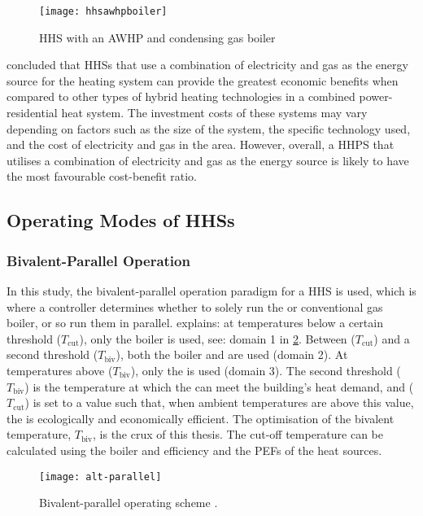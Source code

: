 \begin{figure}[htb]
    \centering
    \texttt{[image: hhsawhpboiler]}
    \caption{\acs{HHS} with an \acs{AWHP} and condensing gas boiler \cite{dongellini_influence_2021}}
    \label{fig:hhsawhpboilerdiagram}
\end{figure}

\citeauthor{heinen_electricity_2016} \cite{heinen_electricity_2016} concluded that \acp{HHS} that use a combination of electricity and gas as the energy source for the heating system can provide the greatest economic benefits when compared to other types of hybrid heating technologies in a combined power-residential heat system. The investment costs of these systems may vary depending on factors such as the size of the system, the specific technology used, and the cost of electricity and gas in the area. However, overall, a \ac{HHPS} that utilises a combination of electricity and gas as the energy source is likely to have the most favourable cost-benefit ratio.


\subsection{Operating Modes of HHSs}

\subsubsection{Bivalent-Parallel Operation}
\label{subsubsec:biv-parallelop}
In this study, the bivalent-parallel operation paradigm for a \ac{HHS} is used, which is where a controller determines whether to solely run the \HP or conventional gas boiler, or so run them in parallel. \citeauthor{buday_2014} \cite{buday_2014} explains: at temperatures below a certain threshold ($T_\text{cut}$), only the boiler is used, see: domain 1 in \cref{fig:alt-parallel}. Between ($T_\text{cut}$) and a second threshold ($T_\text{biv}$), both the boiler and \HP are used (domain 2). At temperatures above ($T_\text{biv}$), only the \HP is used (domain 3). The second threshold ($T_\text{biv}$) is the temperature at which the \HP can meet the building's heat demand, and ($T_\text{cut}$) is set to a value such that, when ambient temperatures are above this value, the \HP is ecologically and economically efficient. The optimisation of the bivalent temperature, $T_\text{biv}$, is the crux of this thesis. The cut-off temperature can be calculated using the boiler and \HP efficiency and the \acp{PEF} of the heat sources. 
\begin{figure}[htb]
    \centering
    \texttt{[image: alt-parallel]}
    \caption{Bivalent-parallel operating scheme \cite{klein_numerical_2014}.}
    \label{fig:alt-parallel}
\end{figure}

